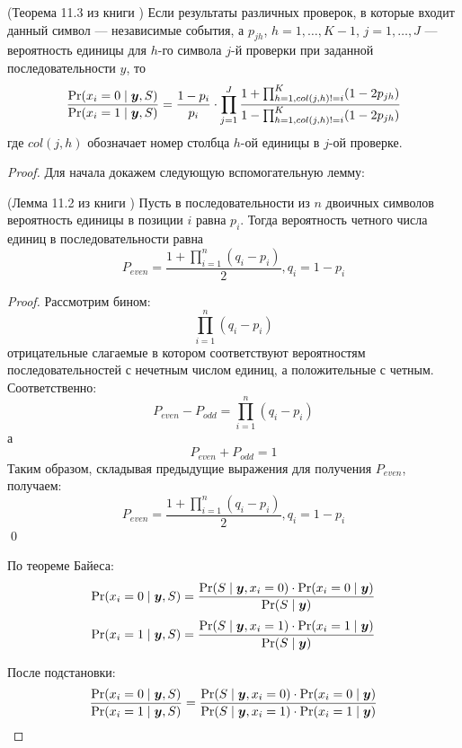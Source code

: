 \begin{theorem}
	(Теорема 11.3 из книги \cite{kudryashov-codingtheory})
	Если результаты различных проверок, в которые входит данный символ --- независимые события, а 
	$p_{jh}$, $h=1,\ldots,K-1$, $j=1,\ldots,J$ --- вероятность единицы для $h$-го символа $j$-й проверки при
	заданной последовательности $y$, то
	\begin{equation}
		\frac{\Pr(x_i=0\mid \boldsymbol{y},S)}{\Pr(x_i=1\mid \boldsymbol{y},S)}=\frac{1-p_i}{p_i} \cdot \prod_{j=1}^{J}
		\frac{1+\prod_{h=1,col(j,h)!=i}^{K}(1-2p_{jh})}{1-\prod_{h=1,col(j,h)!=i}^{K}(1-2p_{jh})}
	\end{equation}
	где $col(j,h)$ обозначает номер столбца $h$-ой единицы в $j$-ой проверке.
\end{theorem}
\begin{proof}
	Для начала докажем следующую вспомогательную лемму:
\begin{lemma}
	(Лемма 11.2 из книги \cite{kudryashov-codingtheory})
	Пусть в последовательности из $n$ двоичных символов вероятность единицы в позиции $i$ равна $p_i$.
	Тогда вероятность четного числа единиц в последовательности равна
	\begin{equation}
		P_{even}=\frac{1+\prod_{i=1}^n(q_i-p_i)}{2}, q_i=1-p_i
	\end{equation}
\end{lemma}
\begin{proof}
	Рассмотрим бином:
	\[
		\prod_{i=1}^n(q_i-p_i)
	\]
	отрицательные слагаемые в котором соответствуют вероятностям последовательностей с нечетным
	числом единиц, а положительные с четным. Соответственно:
	\[
	P_{even} - P_{odd} = \prod_{i=1}^n(q_i-p_i)
	\]
	а
	\[
	P_{even} + P_{odd} = 1
	\]
	Таким образом, складывая предыдущие выражения для получения $P_{even}$, получаем:
	\[
		P_{even}=\frac{1+\prod_{i=1}^n(q_i-p_i)}{2}, q_i=1-p_i
	\]
	\qed
\end{proof}

	По теореме Байеса:
	\begin{equation}
		\Pr(x_i=0\mid \boldsymbol{y},S)=\frac{\Pr(S\mid \boldsymbol{y},x_i=0) \cdot \Pr(x_i=0\mid \boldsymbol{y})}{\Pr(S\mid \boldsymbol{y})}
	\end{equation}
	\begin{equation}
		\Pr(x_i=1\mid \boldsymbol{y},S)=\frac{\Pr(S\mid \boldsymbol{y},x_i=1) \cdot \Pr(x_i=1\mid \boldsymbol{y})}{\Pr(S\mid \boldsymbol{y})}
	\end{equation}
	
	После подстановки:
	\begin{equation}
		\frac{\Pr(x_i=0\mid \boldsymbol{y},S)}{\Pr(x_i=1\mid \boldsymbol{y},S)}=\frac{\Pr(S\mid \boldsymbol{y},x_i=0) \cdot \Pr(x_i=0\mid \boldsymbol{y})}{\Pr(S\mid \boldsymbol{y},x_i=1) \cdot \Pr(x_i=1\mid \boldsymbol{y})}
	\end{equation}
	

\end{proof}
